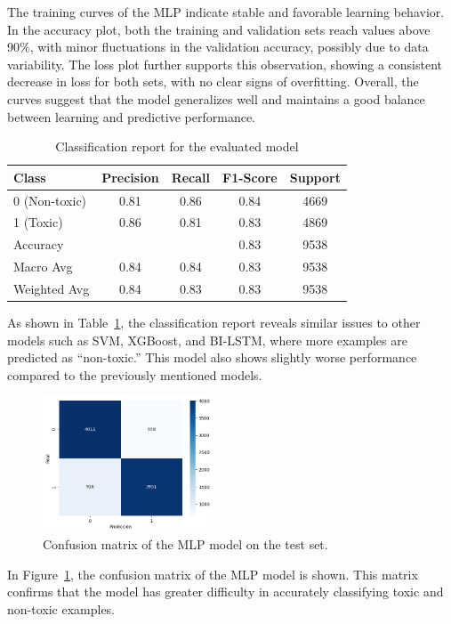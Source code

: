 The training curves of the MLP indicate stable and favorable learning behavior. In the accuracy plot, both the training and validation sets reach values above 90\%, with minor fluctuations in the validation accuracy, possibly due to data variability. The loss plot further supports this observation, showing a consistent decrease in loss for both sets, with no clear signs of overfitting. Overall, the curves suggest that the model generalizes well and maintains a good balance between learning and predictive performance.

\begin{table}[H]
    \centering
    \caption{Classification report for the evaluated model} 
    \label{tab:mlp_classification_report}
    \begin{tabular}{lcccc}
        \toprule
        Class & Precision & Recall & F1-Score & Support \\
        \midrule
        0 (Non-toxic) & 0.81 & 0.86 & 0.84 & 4669 \\
        1 (Toxic)     & 0.86 & 0.81 & 0.83 & 4869 \\
        \midrule
        Accuracy      &      &      & 0.83 & 9538 \\
        Macro Avg     & 0.84 & 0.84 & 0.83 & 9538 \\
        Weighted Avg  & 0.84 & 0.83 & 0.83 & 9538 \\
        \bottomrule
    \end{tabular}
\end{table}

As shown in Table~\ref{tab:mlp_classification_report}, the classification report reveals similar issues to other models such as SVM, XGBoost, and BI-LSTM, where more examples are predicted as “non-toxic.” This model also shows slightly worse performance compared to the previously mentioned models.

\begin{figure}[H]
    \centering
    \includegraphics[width=0.45\textwidth]{images/mlp_confusion_matrix.png}
    \caption{Confusion matrix of the MLP model on the test set.}
    \label{fig:mlp_confusion_matrix}
\end{figure}

In Figure~\ref{fig:mlp_confusion_matrix}, the confusion matrix of the MLP model is shown. This matrix confirms that the model has greater difficulty in accurately classifying toxic and non-toxic examples.